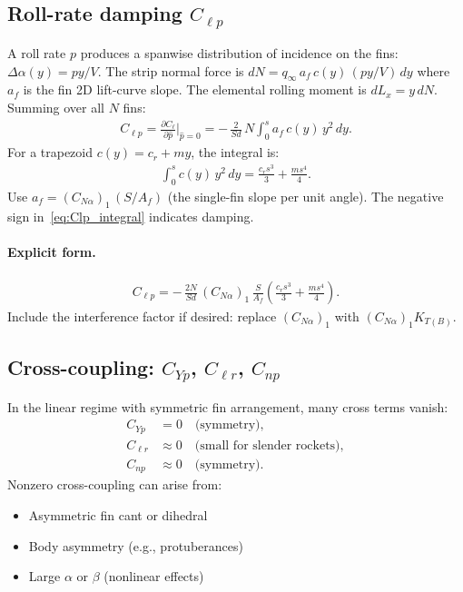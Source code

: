 \documentclass[11pt]{article}
\begin{document}
\subsection{Roll-rate damping $C_{\ell p}$}
A roll rate $p$ produces a spanwise distribution of incidence on the fins: $\Delta\alpha(y) = py/V$. The strip normal force is $dN = q_\infty\,a_f\,c(y)\,(py/V)\,dy$ where $a_f$ is the fin 2D lift-curve slope. The elemental rolling moment is $dL_x = y\,dN$. Summing over all $N$ fins:
\begin{align}
\label{eq:Clp_integral}
C_{\ell p} = \frac{\partial C_\ell}{\partial \hat p}\bigg|_{\hat p=0}
= -\,\frac{2}{Sd}\,N\int_0^s a_f\,c(y)\,y^2\,dy.
\end{align}
For a trapezoid $c(y)=c_r+my$, the integral is:
\begin{align}
\int_0^s c(y)\,y^2\,dy = \frac{c_r s^3}{3} + \frac{m s^4}{4}.
\end{align}
Use $a_f = (C_{N\alpha})_1\,(S/A_f)$ (the single-fin slope per unit angle). The negative sign in~\eqref{eq:Clp_integral} indicates damping.

\paragraph{Explicit form.}
\begin{align}
\label{eq:Clp_explicit}
C_{\ell p} = -\,\frac{2N}{Sd}\,(C_{N\alpha})_1\,\frac{S}{A_f}\left(\frac{c_r s^3}{3}+\frac{m s^4}{4}\right).
\end{align}
Include the interference factor if desired: replace $(C_{N\alpha})_1$ with $(C_{N\alpha})_1 K_{T(B)}$.

\subsection{Cross-coupling: $C_{Yp}$, $C_{\ell r}$, $C_{np}$}
In the linear regime with symmetric fin arrangement, many cross terms vanish:
\begin{align}
C_{Yp} &= 0 \quad \text{(symmetry)},\\
C_{\ell r} &\approx 0 \quad \text{(small for slender rockets)},\\
C_{np} &\approx 0 \quad \text{(symmetry)}.
\end{align}
Nonzero cross-coupling can arise from:
\begin{itemize}[leftmargin=2em]
\item Asymmetric fin cant or dihedral
\item Body asymmetry (e.g., protuberances)
\item Large $\alpha$ or $\beta$ (nonlinear effects)
\end{itemize}
\end{document}
